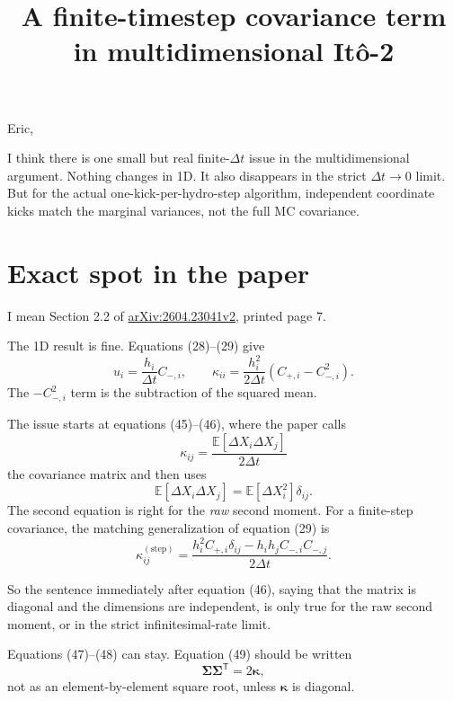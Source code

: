 \documentclass[11pt]{article}
\title{\textbf{A finite-timestep covariance term\\
in multidimensional It\^o-2}}
\author{}
\date{}
\newcommand{\mean}[1]{\mathbb{E}\!\left[#1\right]}
\begin{document}
\maketitle
\vspace{-2.5em}

Eric,

I think there is one small but real finite-\(\Delta t\) issue in the
multidimensional argument. Nothing changes in 1D. It also disappears in the
strict \(\Delta t\rightarrow0\) limit. But for the actual one-kick-per-hydro-step
algorithm, independent coordinate kicks match the marginal variances, not the
full MC covariance.

\section*{Exact spot in the paper}

I mean Section 2.2 of
\href{https://arxiv.org/abs/2604.23041v2}{arXiv:2604.23041v2},
printed page 7.

The 1D result is fine. Equations (28)--(29) give
\begin{equation}
  u_i=\frac{h_i}{\Delta t}C_{-,i},
  \qquad
  \kappa_{ii}
  =
  \frac{h_i^2}{2\Delta t}
  \left(C_{+,i}-C_{-,i}^2\right).
\end{equation}
The \(-C_{-,i}^2\) term is the subtraction of the squared mean.

The issue starts at equations (45)--(46), where the paper calls
\begin{equation}
  \kappa_{ij}
  =
  \frac{\mean{\Delta X_i\Delta X_j}}{2\Delta t}
\end{equation}
the covariance matrix and then uses
\begin{equation}
  \mean{\Delta X_i\Delta X_j}
  =
  \mean{\Delta X_i^2}\delta_{ij}.
\end{equation}
The second equation is right for the \emph{raw} second moment.
For a finite-step covariance, the matching generalization of equation (29) is
\begin{equation}
  \boxed{
  \kappa_{ij}^{(\mathrm{step})}
  =
  \frac{
  h_i^2 C_{+,i}\delta_{ij}
  -
  h_i h_j C_{-,i}C_{-,j}
  }{2\Delta t}.
  }
\end{equation}

So the sentence immediately after equation (46), saying that the matrix is
diagonal and the dimensions are independent, is only true for the raw second
moment, or in the strict infinitesimal-rate limit.

Equations (47)--(48) can stay. Equation (49) should be written
\begin{equation}
  \boxed{
  \boldsymbol{\Sigma}\boldsymbol{\Sigma}^{\mathsf T}
  =
  2\boldsymbol{\kappa},
  }
\end{equation}
not as an element-by-element square root, unless
\(\boldsymbol{\kappa}\) is diagonal.
\end{document}
